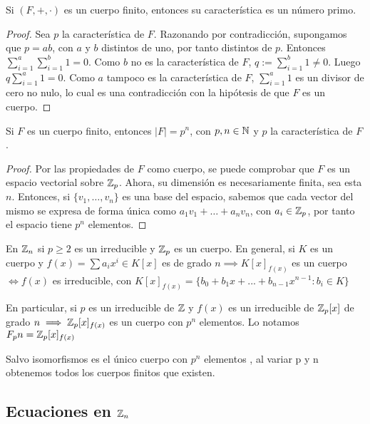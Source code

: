 \begin{nprop}
  Si $(F, +, \cdot)$ es un cuerpo finito, entonces su característica es un número primo.
\end{nprop}

\begin{proof}
  Sea $p$ la característica de $F$. Razonando por contradicción, supongamos que $p = ab$, con $a$ y $b$ distintos de uno, por tanto distintos de $p$.
  Entonces $\sum_{i=1}^a \sum_{i=1}^b 1 = 0$. Como $b$ no es la característica de $F$, $q := \sum_{i=1}^b 1 \ne 0$. Luego $q \sum_{i=1}^a 1 = 0$. Como $a$ tampoco
  es la característica de $F$, $\sum_{i=1}^a 1$ es un divisor de cero no nulo, lo cual es una contradicción con la hipótesis de que $F$ es un cuerpo.
\end{proof}

\begin{nprop}
  Si $F$ es un cuerpo finito, entonces $|F| = p^n$, con $p, n \in \mathbb{N}$ y $p$ la característica de $F$.
\end{nprop}

\begin{proof}
  Por las propiedades de $F$ como cuerpo, se puede comprobar que $F$ es un espacio vectorial sobre $\mathbb{Z}_{p}$.
  Ahora, su dimensión es necesariamente finita, sea esta $n$. Entonces, si $\{v_1, \dots, v_n\}$ es una base del espacio,
  sabemos que cada vector del mismo se expresa de forma única como $a_1v_1 + \dots + a_nv_n$, con $a_i \in \mathbb{Z}_{p}$, por tanto el espacio tiene $p^n$ elementos.
\end{proof}

En $\mathbb{Z}_n$ si $p \geq 2$ es un irreducible y $\mathbb{Z}_p $ es un cuerpo. En general, si $K$ es un cuerpo y $f(x) = \sum a_i x^i \in K[x]$ es de grado $n \implies K[x]_{f(x)}$
 es un cuerpo $\iff f(x)$ es irreducible, con $K[x]_{f(x)} = \{b_0 +b_1 x + ... + b_{n-1}x^{n-1} :  b_i \in K \}$


En particular, si $p$ es un irreducible de $\mathbb{Z}$ y $f(x)$ es un irreducible de $\mathbb{Z}_p[x]$ de grado $n \implies \mathbb{Z}_p[x]_{f(x)}$ es un cuerpo con $p^n$ elementos. Lo notamos $F_pn = \mathbb{Z}_p[x]_{f(x)}$

Salvo isomorfismos es el único cuerpo con $p^n$ elementos , al variar p y n obtenemos todos los cuerpos finitos que existen.
\subsection{Ecuaciones en $\mathbb{Z}_n$}

